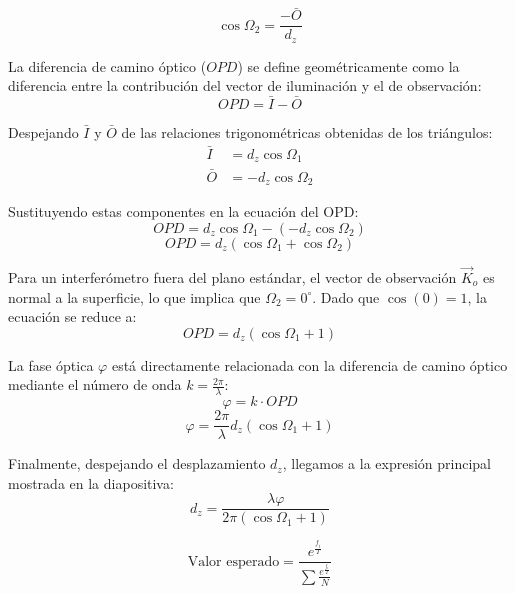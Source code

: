 \documentclass[12pt]{article}
\begin{document}
\begin{enumerate}
\begin{figure}[h!]
\begin{minipage}{0.45\textwidth}
		\vspace{0.5cm}
		\Large
		\[ \cos\Omega_2 = \frac{-\bar{O}}{d_z} \]
		\normalsize
	\end{minipage}
\end{figure}

\vspace{0.3cm}
\noindent La diferencia de camino óptico ($OPD$) se define geométricamente como la diferencia entre la contribución del vector de iluminación y el de observación:
\[ OPD = \bar{I} - \bar{O} \]

\noindent Despejando $\bar{I}$ y $\bar{O}$ de las relaciones trigonométricas obtenidas de los triángulos:
\begin{align*}
	\bar{I} &= d_z \cos\Omega_1 \\
	\bar{O} &= -d_z \cos\Omega_2
\end{align*}

\noindent Sustituyendo estas componentes en la ecuación del OPD:
\[ OPD = d_z \cos\Omega_1 - (-d_z \cos\Omega_2) \]
\[ OPD = d_z (\cos\Omega_1 + \cos\Omega_2) \]

\noindent Para un interferómetro fuera del plano estándar, el vector de observación $\vec{K}_o$ es normal a la superficie, lo que implica que $\Omega_2 = 0^\circ$. Dado que $\cos(0) = 1$, la ecuación se reduce a:
\[ OPD = d_z (\cos\Omega_1 + 1) \]

\noindent La fase óptica $\varphi$ está directamente relacionada con la diferencia de camino óptico mediante el número de onda $k = \frac{2\pi}{\lambda}$:
\[ \varphi = k \cdot OPD \]
\[ \varphi = \frac{2\pi}{\lambda} d_z (\cos\Omega_1 + 1) \]

\noindent Finalmente, despejando el desplazamiento $d_z$, llegamos a la expresión principal mostrada en la diapositiva:
\[ d_z = \frac{\lambda \varphi}{2\pi (\cos\Omega_1 + 1)} \]
		
	\end{enumerate}
	
	
	
	$$ \text{Valor esperado} = \frac{e^{\frac{f_i}{T}}}{\sum \frac{e^{\frac{f_i}{T}}}{N}} $$ 
\end{document}
